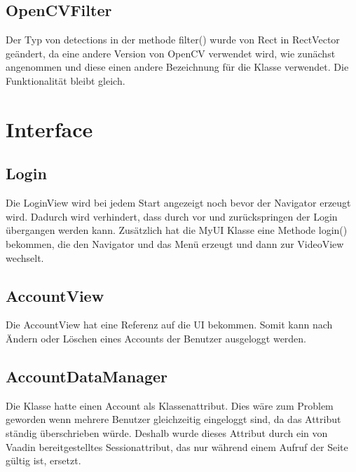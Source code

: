 \subsection{OpenCVFilter}
Der Typ von detections in der methode filter() wurde von Rect in RectVector geändert, da eine andere Version von OpenCV verwendet wird, wie zunächst angenommen und diese einen andere Bezeichnung für die Klasse verwendet. Die Funktionalität bleibt gleich.

\section{Interface}

\subsection{Login}
Die LoginView wird bei jedem Start angezeigt noch bevor der Navigator erzeugt wird. Dadurch wird verhindert, dass durch vor und zurückspringen der Login übergangen werden kann. Zusätzlich hat die MyUI Klasse eine Methode login() bekommen, die den Navigator und das Menü erzeugt und dann zur VideoView wechselt.

\subsection{AccountView}
Die AccountView hat eine Referenz auf die UI bekommen. Somit kann nach Ändern oder Löschen eines Accounts der Benutzer ausgeloggt werden.

\subsection{AccountDataManager}
Die Klasse hatte einen Account als Klassenattribut. Dies wäre zum Problem geworden wenn mehrere Benutzer gleichzeitig eingeloggt sind, da das Attribut ständig überschrieben würde. Deshalb wurde dieses Attribut durch ein von Vaadin bereitgestelltes Sessionattribut, das nur während einem Aufruf der Seite gültig ist, ersetzt.

